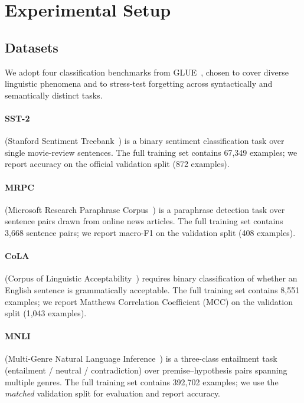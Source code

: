 
\section{Experimental Setup}
\label{sec:setup}

\subsection{Datasets}

We adopt four classification benchmarks from GLUE~\cite{wang2018glue}, chosen to cover diverse
linguistic phenomena and to stress-test forgetting across syntactically and semantically distinct
tasks.

\paragraph{SST-2} (Stanford Sentiment Treebank~\cite{socher2013sst}) is a binary sentiment
classification task over single movie-review sentences.
The full training set contains 67{,}349 examples; we report accuracy on the official validation
split (872 examples).

\paragraph{MRPC} (Microsoft Research Paraphrase Corpus~\cite{dolan2005mrpc}) is a paraphrase
detection task over sentence pairs drawn from online news articles.
The full training set contains 3{,}668 sentence pairs; we report macro-F1 on the validation
split (408 examples).

\paragraph{CoLA} (Corpus of Linguistic Acceptability~\cite{warstadt2019cola}) requires binary
classification of whether an English sentence is grammatically acceptable.
The full training set contains 8{,}551 examples; we report Matthews Correlation Coefficient (MCC)
on the validation split (1{,}043 examples).

\paragraph{MNLI} (Multi-Genre Natural Language Inference~\cite{williams2018mnli}) is a three-class
entailment task (entailment / neutral / contradiction) over premise--hypothesis pairs spanning
multiple genres.
The full training set contains 392{,}702 examples; we use the \emph{matched} validation split for
evaluation and report accuracy.

